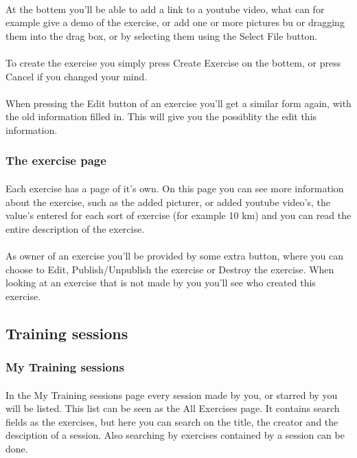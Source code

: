\documentclass[11pt,a4paper]{scrartcl}
\begin{document}
\paragraph{}At the bottem you'll be able to add a link to a youtube video, what can for example give a demo of the exercise, or add one or more pictures bu or dragging them into the drag box, or by selecting them using the Select File button. 
\paragraph{}To create the exercise you simply press Create Exercise on the bottem, or press Cancel if you changed your mind.
\paragraph{}When pressing the Edit button of an exercise you'll get a similar form again, with the old information filled in. This will give you the possiblity the edit this information.

\subsubsection{The exercise page}
\paragraph{}Each exercise has a page of it's own. On this page you can see more information about the exercise, such as the added picturer, or added youtube video's, the value's entered for each sort of exercise (for example 10 km) and you can read the entire description of the exercise.
\paragraph{}As owner of an exercise you'll be provided by some extra button, where you can choose to Edit, Publish/Unpublish the exercise or Destroy the exercise. When looking at an exercise that is not made by you you'll see who created this exercise.

\subsection{Training sessions}
\subsubsection{My Training sessions}
\paragraph{}In the My Training sessions page every session made by you, or starred by you will be listed. This list can be seen as the All Exercises page. It contains search fields as the exercises, but here you can search on the title, the creator and the desciption of a session. Also searching by exercises contained by a session can be done.
\end{document}
